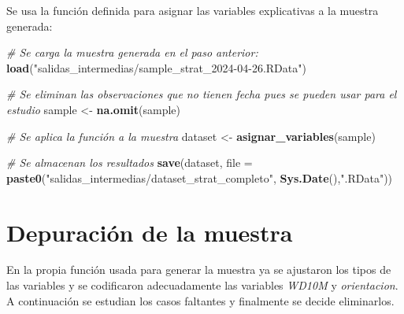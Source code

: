 \documentclass[12pt,a4paper,]{book}
\newenvironment{Shaded}{\begin{snugshade}}{\end{snugshade}}
\newcommand{\AttributeTok}[1]{\textcolor[rgb]{0.13,0.29,0.53}{#1}}
\newcommand{\CommentTok}[1]{\textcolor[rgb]{0.56,0.35,0.01}{\textit{#1}}}
\newcommand{\FunctionTok}[1]{\textcolor[rgb]{0.13,0.29,0.53}{\textbf{#1}}}
\newcommand{\NormalTok}[1]{#1}
\newcommand{\OtherTok}[1]{\textcolor[rgb]{0.56,0.35,0.01}{#1}}
\newcommand{\StringTok}[1]{\textcolor[rgb]{0.31,0.60,0.02}{#1}}
\numberwithin{dummy}{section}
\theoremstyle{ocrenumbox}
\theoremstyle{blacknumex}
\theoremstyle{blacknumbox}
\theoremstyle{ocrenum}
\theoremstyle{ocrenum}
\begin{document}
Se usa la función definida para asignar las variables explicativas a la
muestra generada:

\begin{Shaded}
\begin{Highlighting}[]
\CommentTok{\# Se carga la muestra generada en el paso anterior:}
\FunctionTok{load}\NormalTok{(}\StringTok{"salidas\_intermedias/sample\_strat\_2024{-}04{-}26.RData"}\NormalTok{)}

\CommentTok{\# Se eliminan las observaciones que no tienen fecha pues se pueden usar para el estudio}
\NormalTok{sample }\OtherTok{\textless{}{-}} \FunctionTok{na.omit}\NormalTok{(sample)}

\CommentTok{\# Se aplica la función a la muestra }
\NormalTok{dataset }\OtherTok{\textless{}{-}} \FunctionTok{asignar\_variables}\NormalTok{(sample)}

\CommentTok{\# Se almacenan los resultados}
\FunctionTok{save}\NormalTok{(dataset,}
     \AttributeTok{file =} \FunctionTok{paste0}\NormalTok{(}\StringTok{"salidas\_intermedias/dataset\_strat\_completo"}\NormalTok{,}
                   \FunctionTok{Sys.Date}\NormalTok{(),}\StringTok{".RData"}\NormalTok{))}
\end{Highlighting}
\end{Shaded}

\hypertarget{depuraciuxf3n-de-la-muestra}{%
\section{Depuración de la muestra}\label{depuraciuxf3n-de-la-muestra}}

En la propia función usada para generar la muestra ya se ajustaron los
tipos de las variables y se codificaron adecuadamente las variables
\emph{WD10M} y \emph{orientacion}. A continuación se estudian los casos
faltantes y finalmente se decide eliminarlos.
\end{document}
